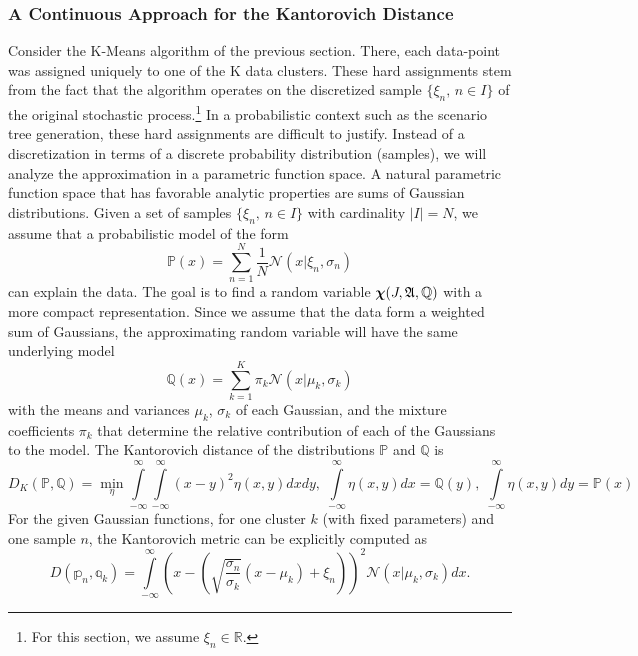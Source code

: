 \subsubsection{A Continuous Approach for the Kantorovich Distance}
\label{sec:cont-appr-kant}
Consider the K-Means algorithm of the previous section.
There, each data-point was assigned uniquely to one of the K data clusters.
These hard assignments stem from the fact that the algorithm operates on the discretized sample $\{\xi_n,\, n\in I\}$ of the original stochastic process.\footnote{For this section, we assume $\xi_n\in\mathbb{R}$.}
In a probabilistic context such as the scenario tree generation, these hard assignments are difficult to justify.
Instead of a discretization in terms of a discrete probability distribution (samples), we will analyze the approximation in a parametric function space.
A natural parametric function space that has favorable analytic properties are sums of Gaussian distributions.
Given a set of samples $\{\xi_n,\, n\in I\}$ with cardinality $|I|=N$, we assume that a probabilistic model of the form
\begin{equation}
  \label{eq:31}
  \mathbb{P}(x) = \sum_{n=1}^N\frac{1}{N}\mathcal{N}(x|\xi_n,\sigma_n)
\end{equation}
can explain the data.
The goal is to find a random variable $\boldsymbol\chi(J,\mathfrak{A},\mathbb{Q})$ with a more compact representation.
Since we assume that the data form a weighted sum of Gaussians, the approximating random variable will have the same underlying model
\begin{equation}
  \label{eq:32}
  \mathbb{Q}(x) = \sum_{k=1}^K\pi_k\mathcal{N}(x|\mu_k, \sigma_k)
\end{equation}
with the means and variances $\mu_k$, $\sigma_k$ of each Gaussian, and the mixture coefficients $\pi_k$ that determine the relative contribution of each of the Gaussians to the model.
The Kantorovich distance of the distributions $\mathbb{P}$ and $\mathbb{Q}$ is
\begin{equation}
  \label{eq:33}
  D_K(\mathbb{P,Q}) = \min\limits_{\eta}\int\limits_{-\infty}^{\infty}\int\limits_{-\infty}^{\infty}(x-y)^2\eta(x,y)dxdy,\; \int\limits_{-\infty}^{\infty}\eta(x,y)dx = \mathbb{Q}(y),\;\int\limits_{-\infty}^{\infty}\eta(x,y)dy = \mathbb{P}(x)
\end{equation}
For the given Gaussian functions, for one cluster $k$ (with fixed parameters) and one sample $n$, the Kantorovich metric can be explicitly computed as
\begin{equation}
  \label{eq:34}
  D(\mathbb{p}_n,\mathbb{q}_k) = \int\limits_{-\infty}^{\infty}\left(x-\left(\sqrt{\frac{\sigma_n}{\sigma_k}}(x-\mu_k)+\xi_n\right)\right)^2\mathcal{N}(x|\mu_k,\sigma_k)dx.
\end{equation}
